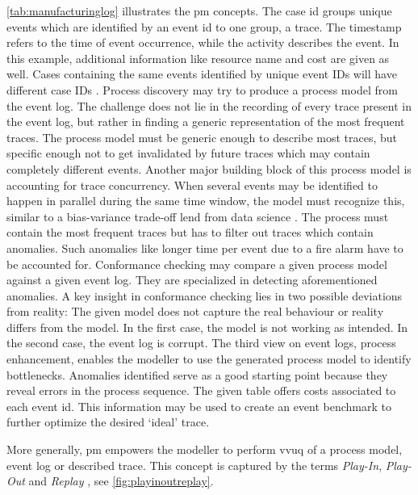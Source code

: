 \autoref{tab:manufacturinglog} illustrates the \gls{pm} concepts. The case \gls{id} groups unique events which are identified by an event \gls{id} to one group, a trace. The timestamp refers to the time of event occurrence, while the activity describes the event. In this example, additional information like resource name and cost are given as well. Cases containing the same events identified by unique event IDs will have different case IDs \autocite{van2016data}. Process discovery may try to produce a process model from the event log. The challenge does not lie in the recording of every trace present in the event log, but rather in finding a generic representation of the most frequent traces. The process model must be generic enough to describe most traces, but specific enough not to get invalidated by future traces which may contain completely different events. Another major building block of this process model is accounting for trace concurrency. When several events may be identified to happen in parallel during the same time window, the model must recognize this, similar to a bias-variance trade-off lend from data science \autocite{briscoe2011conceptual}. The process must contain the most frequent traces but has to filter out traces which contain anomalies. Such anomalies like longer time per event due to a fire alarm have to be accounted for. Conformance checking may compare a given process model against a given event log. They are specialized in detecting aforementioned anomalies. A key insight in conformance checking lies in two possible deviations from reality: The given model does not capture the real behaviour or reality differs from the model. In the first case, the model is not working as intended. In the second case, the event log is corrupt. The third view on event logs, process enhancement, enables the modeller to use the generated process model to identify bottlenecks. Anomalies identified serve as a good starting point because they reveal errors in the process sequence. The given table offers costs associated to each event \gls{id}. This information may be used to create an event benchmark to further optimize the desired `ideal' trace.

More generally, \gls{pm} empowers the modeller to perform \gls{vvuq} of a process model, event log or described trace. This concept is captured by the terms \textit{Play-In}, \textit{Play-Out} and \textit{Replay} \autocite{damm2001lscs}, see \autoref{fig:playinoutreplay}.

